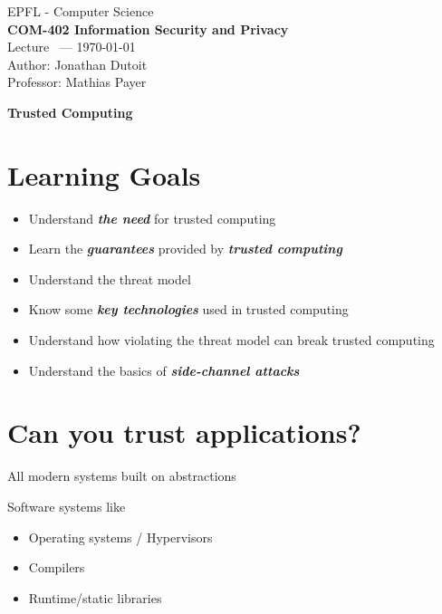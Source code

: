 \documentclass[11pt]{article}
\newcommand{\coursename}{COM-402 Information Security and Privacy}
\newcommand{\lecturedate}{\today}
\newcommand{\professor}{Mathias Payer}
\begin{document}
\begin{center}
  {\large EPFL - Computer Science} \\[0.5em]
  {\Large \textbf{\coursename}} \\[0.5em]
  {\large Lecture \lecturenum\ --- \lecturedate} \\[0.5em]
  {\large Author: Jonathan Dutoit} \\[0.5em]
  {\large Professor: \professor} \\[0.5em]
\end{center}

\vspace{2cm}

\begin{center}
  {\LARGE \textbf{Trusted Computing}}
\end{center}

\vspace{1cm}

\section*{Learning Goals}

\begin{itemize}
	\item Understand \textit{\textbf{the need}} for trusted computing
	\item Learn the \textbf{\textit{guarantees}} provided by \textit{\textbf{trusted computing}}
	\item Understand the threat model
	\item Know some \textbf{\textit{key technologies}} used in trusted computing
	\item Understand how violating the threat model can break trusted computing
	\item Understand the basics of \textit{\textbf{side-channel attacks}}
\end{itemize}

\section*{Can you trust applications?}

All modern systems built on abstractions

Software systems like
\begin{itemize}
	\item Operating systems / Hypervisors
	\item Compilers
	\item Runtime/static libraries
\end{itemize}
\end{document}
